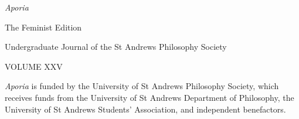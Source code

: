\begin{center}
    \vspace*{7cm}
    
    {\huge\textit{Aporia}}

    \vspace{1cm}

    {\large The Feminist Edition}

    \vspace{3cm}
    \normalsize
    Undergraduate Journal of the St Andrews Philosophy Society

    \vspace{1cm}
    VOLUME XXV
\end{center}

\vfill 

\noindent \textit{Aporia} is funded by the University of St Andrews Philosophy
Society, which receives funds from the University of St Andrews
Department of Philosophy, the University of St Andrews Students’
Association, and independent benefactors.
